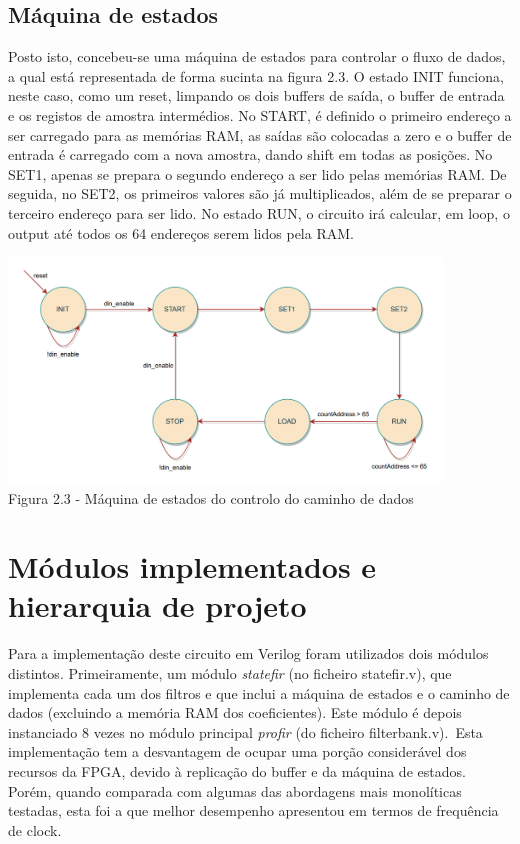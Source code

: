\documentclass[10pt,twoside]{article}
\begin{document}
\subsection{Máquina de estados}
Posto isto, concebeu-se uma máquina de estados para controlar o fluxo de dados, a qual está representada de forma sucinta na figura 2.3. O estado INIT funciona, neste caso, como um reset, limpando os dois buffers de saída, o buffer de entrada e os registos de amostra intermédios. No START, é definido o primeiro endereço a ser carregado para as memórias RAM, as saídas são colocadas a zero e o buffer de entrada é carregado com a nova amostra, dando shift em todas as posições. No SET1, apenas se prepara o segundo endereço a ser lido pelas memórias RAM. De seguida, no SET2, os primeiros valores são já multiplicados, além de se preparar o terceiro endereço para ser lido. No estado RUN, o circuito irá calcular, em loop, o output até todos os 64 endereços serem lidos pela RAM.

\begin{center}
	\includegraphics[height=6cm]{figures/stateMachine.png}\\
	Figura 2.3 - Máquina de estados do controlo do caminho de dados 
\end{center}

\section{Módulos implementados e hierarquia de projeto}
Para a implementação deste circuito em Verilog foram utilizados dois módulos distintos. Primeiramente, um módulo \textit{statefir} (no ficheiro statefir.v), que implementa cada um dos filtros e que inclui a máquina de estados e o caminho de dados (excluindo a memória RAM dos coeficientes). Este módulo é depois instanciado 8 vezes no módulo principal \textit{profir} (do ficheiro filterbank.v).\
Esta implementação tem a desvantagem de ocupar uma porção considerável dos recursos da FPGA, devido à replicação do buffer e da máquina de estados. Porém, quando comparada com algumas das abordagens mais monolíticas testadas, esta foi a que melhor desempenho apresentou em termos de frequência de clock.
\end{document}
